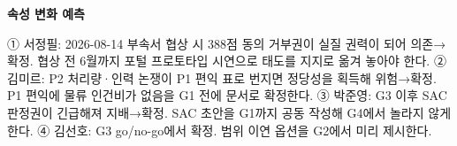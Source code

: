 \documentclass[10pt,a4paper]{article}
\begin{document}
\begin{fieldbox}
\textbf{속성 변화 예측} \par
\ifwbblank
{}
\else
① 서정필: 2026-08-14 부속서 협상 시 388점 동의 거부권이 실질 권력이 되어 의존→확정. 협상 전 6월까지 포털 프로토타입 시연으로 태도를 지지로 옮겨 놓아야 한다. ② 김미르: P2 처리량·인력 논쟁이 P1 편익 표로 번지면 정당성을 획득해 위험→확정. P1 편익에 물류 인건비가 없음을 G1 전에 문서로 확정한다. ③ 박준영: G3 이후 SAC 판정권이 긴급해져 지배→확정. SAC 초안을 G1까지 공동 작성해 G4에서 놀라지 않게 한다. ④ 김선호: G3 go/no-go에서 확정. 범위 이연 옵션을 G2에서 미리 제시한다.
\fi
\end{fieldbox}
\end{document}
